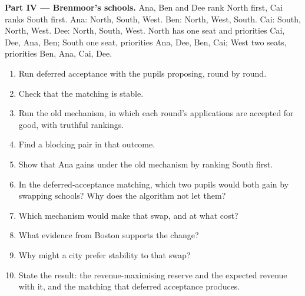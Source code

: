 \begin{problem}
\medskip\noindent\textbf{Part IV --- Brenmoor's schools.} Ana, Ben and Dee rank North
first, Cai ranks South first. Ana: North, South, West. Ben: North, West, South. Cai: South,
North, West. Dee: North, South, West. North has one seat and priorities Cai, Dee, Ana, Ben;
South one seat, priorities Ana, Dee, Ben, Cai; West two seats, priorities Ben, Ana, Cai,
Dee.
\begin{enumerate}[resume]
\item Run deferred acceptance with the pupils proposing, round by round.
\item Check that the matching is stable.
\item Run the old mechanism, in which each round's applications are accepted for
good, with truthful rankings.
\item Find a blocking pair in that outcome.
\item Show that Ana gains under the old mechanism by ranking South first.
\item In the deferred-acceptance matching, which two pupils would both gain by
swapping schools? Why does the algorithm not let them?
\item Which mechanism would make that swap, and at what cost?
\item What evidence from Boston supports the change?
\item Why might a city prefer stability to that swap?
\item State the result: the revenue-maximising reserve and the expected revenue with
it, and the matching that deferred acceptance produces.
\end{enumerate}
\end{problem}
